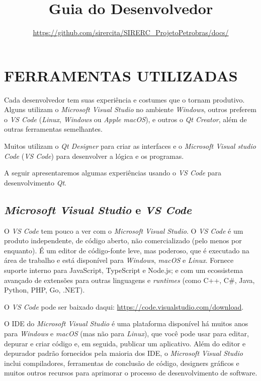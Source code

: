 \documentclass[a4paper,11pt]{article}
\title{Guia do Desenvolvedor \sistema}
\date{\url{https://github.com/sirercita/SIRERC_ProjetoPetrobras/docs/}}
\newcommand{\qtcreator}{\textit{Qt Creator}}
\newcommand{\qtdesigner}{\textit{Qt Designer}}
\newcommand{\qt}{\textit{Qt}}
\newcommand{\vscode}{\textit{VS Code}}
\newcommand{\msvs}{\textit{Microsoft Visual Studio}}
\newcommand{\windows}{\textit{Windows}}
\newcommand{\linux}{\textit{Linux}}
\begin{document}
\maketitle

\newpage
\begin{versionhistory}
\end{versionhistory}

\newpage

\tableofcontents

\newpage
\section{FERRAMENTAS UTILIZADAS}

Cada desenvolvedor tem suas experiência e costumes que o tornam produtivo.
Alguns utilizam o \textit{Microsoft Visual Studio} no ambiente \windows{}, outros preferem o \vscode{} (\linux{}, \windows{} ou \textit{Apple macOS}), e outros o \qtcreator{}, além de outras ferramentas semelhantes.

Muitos utilizam o \qtdesigner{} para criar as interfaces e o \textit{Microsoft Visual studio Code} (\vscode{}) para desenvolver a lógica e os programas.

A seguir apresentaremos algumas experiências usando o \vscode{} para desenvolvimento \qt{}.


\subsection{\msvs{} e \vscode{}}

O \vscode{} tem pouco a ver com o \msvs{}.
O \vscode{} é um produto independente, de código aberto, não comercializado (pelo menos por enquanto).
É um editor de código-fonte leve, mas poderoso, que é executado na área de trabalho e está disponível para \windows{}, \textit{macOS} e \linux{}. Fornece suporte interno para JavaScript, TypeScript e Node.js; e com um ecossistema avançado de extensões para outras linguagens e \textit{runtimes} (como C++, C\#, Java, Python, PHP, Go, .NET).

O \vscode{} pode ser baixado daqui: \url{https://code.visualstudio.com/download}.

O IDE do \msvs{} é uma plataforma disponível há muitos anos para \windows{} e \textit{macOS} (mas não para \linux{}), que você pode usar para editar, depurar e criar código e, em seguida, publicar um aplicativo. Além do editor e depurador padrão fornecidos pela maioria dos IDE, o \msvs{} inclui compiladores, ferramentas de conclusão de código, designers gráficos e muitos outros recursos para aprimorar o processo de desenvolvimento de software.
\end{document}
